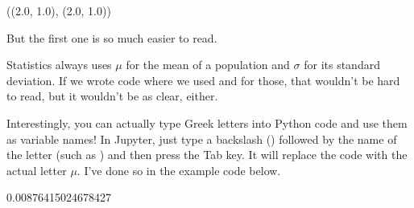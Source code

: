 \documentclass[letterpaper,10pt,english]{sphinxmanual}
\begin{document}
\begin{sphinxVerbatim}[commandchars=\\\{\}]
((2.0, 1.0), (2.0, 1.0))
\end{sphinxVerbatim}

But the first one is so much easier to read.

  Statistics always uses \(\mu\) for the mean of a population and \(\sigma\) for its standard deviation.  If we wrote code where we used  and  for those, that wouldn’t be hard to read, but it wouldn’t be as clear, either.

Interestingly, you can actually type Greek letters into Python code and use them as variable names!  In Jupyter, just type a backslash (\sphinxcode{\sphinxupquote{\textbackslash{}}}) followed by the name of the letter (such as ) and then press the Tab key.  It will replace the code  with the actual letter \(\mu\).  I’ve done so in the example code below.

\begin{sphinxVerbatim}[commandchars=\\\{\}]
      
            
          \PYGZbs{}
              

    
\end{sphinxVerbatim}

\begin{sphinxVerbatim}[commandchars=\\\{\}]
0.00876415024678427
\end{sphinxVerbatim}
\end{document}
